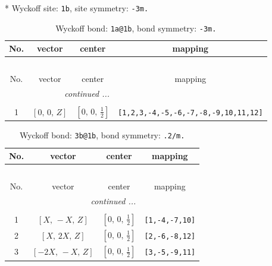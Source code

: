 \documentclass[fleqn,8pt]{jsarticle}
\begin{document}
* Wyckoff site: {\tt 1b}, site symmetry: {\tt -3m.}
\renewcommand{\arraystretch}{1.2}
\begin{longtable}{cccc}
\caption{Wyckoff bond: {\tt 1a@1b}, bond symmetry: {\tt -3m.}}
 \\
 \hline \hline
No. & vector & center & mapping \\ \hline \endfirsthead

\multicolumn{3}{l}{\tablename\ \thetable{}} \\
 \hline \hline
No. & vector & center & mapping \\ \hline \endhead

 \hline \hline
\multicolumn{3}{r}{\footnotesize\it continued ...} \\ \endfoot

 \hline \hline
\multicolumn{3}{r}{} \\ \endlastfoot

1 & $\left[ 0,\, 0,\, Z \right]$ & $\left[ 0,\, 0,\, \frac{1}{2} \right]$ & {\tt [1,2,3,-4,-5,-6,-7,-8,-9,10,11,12]} \\
\end{longtable}
\renewcommand{\arraystretch}{1.2}
\begin{longtable}{cccc}
\caption{Wyckoff bond: {\tt 3b@1b}, bond symmetry: {\tt .2/m.}}
 \\
 \hline \hline
No. & vector & center & mapping \\ \hline \endfirsthead

\multicolumn{3}{l}{\tablename\ \thetable{}} \\
 \hline \hline
No. & vector & center & mapping \\ \hline \endhead

 \hline \hline
\multicolumn{3}{r}{\footnotesize\it continued ...} \\ \endfoot

 \hline \hline
\multicolumn{3}{r}{} \\ \endlastfoot

1 & $\left[ X,\, - X,\, Z \right]$ & $\left[ 0,\, 0,\, \frac{1}{2} \right]$ & {\tt [1,-4,-7,10]} \\ \hline
2 & $\left[ X,\, 2 X,\, Z \right]$ & $\left[ 0,\, 0,\, \frac{1}{2} \right]$ & {\tt [2,-6,-8,12]} \\ \hline
3 & $\left[ - 2 X,\, - X,\, Z \right]$ & $\left[ 0,\, 0,\, \frac{1}{2} \right]$ & {\tt [3,-5,-9,11]} \\
\end{longtable}
\renewcommand{\arraystretch}{1.2}
\end{document}
